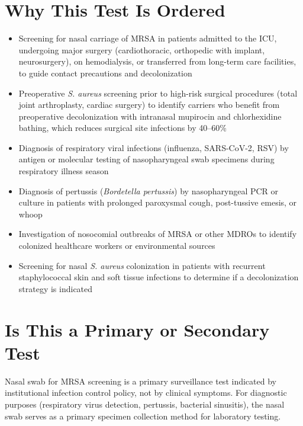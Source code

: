 \section*{Why This Test Is Ordered}
\begin{itemize}
  \item Screening for nasal carriage of MRSA in patients admitted to the ICU, undergoing major surgery (cardiothoracic, orthopedic with implant, neurosurgery), on hemodialysis, or transferred from long-term care facilities, to guide contact precautions and decolonization
  \item Preoperative \textit{S. aureus} screening prior to high-risk surgical procedures (total joint arthroplasty, cardiac surgery) to identify carriers who benefit from preoperative decolonization with intranasal mupirocin and chlorhexidine bathing, which reduces surgical site infections by 40--60\%
  \item Diagnosis of respiratory viral infections (influenza, SARS-CoV-2, RSV) by antigen or molecular testing of nasopharyngeal swab specimens during respiratory illness season
  \item Diagnosis of pertussis (\textit{Bordetella pertussis}) by nasopharyngeal PCR or culture in patients with prolonged paroxysmal cough, post-tussive emesis, or whoop
  \item Investigation of nosocomial outbreaks of MRSA or other MDROs to identify colonized healthcare workers or environmental sources
  \item Screening for nasal \textit{S. aureus} colonization in patients with recurrent staphylococcal skin and soft tissue infections to determine if a decolonization strategy is indicated
\end{itemize}

\section*{Is This a Primary or Secondary Test}
Nasal swab for MRSA screening is a primary surveillance test indicated by institutional infection control policy, not by clinical symptoms. For diagnostic purposes (respiratory virus detection, pertussis, bacterial sinusitis), the nasal swab serves as a primary specimen collection method for laboratory testing.

